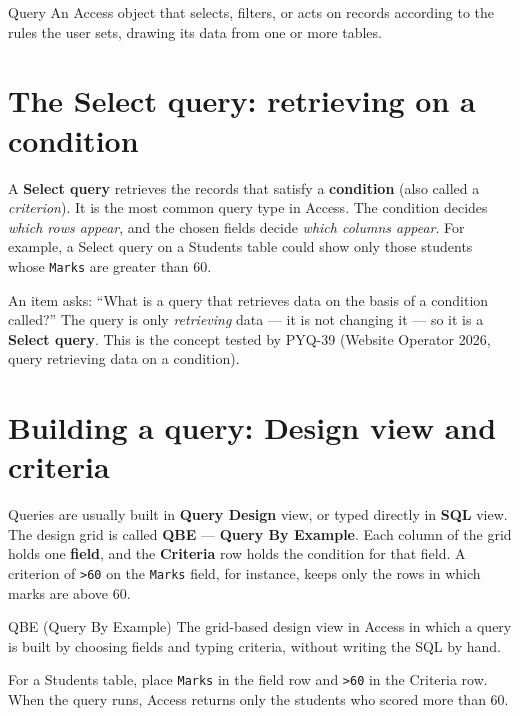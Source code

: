 \begin{definitionbox}{Query}
An Access object that selects, filters, or acts on records according to the
rules the user sets, drawing its data from one or more tables.
\end{definitionbox}

\section{The Select query: retrieving on a condition}
A \textbf{Select query} retrieves the records that satisfy a
\textbf{condition} (also called a \emph{criterion}). It is the most common
query type in Access. The condition decides \emph{which rows appear}, and
the chosen fields decide \emph{which columns appear}. For example, a Select
query on a Students table could show only those students whose
\texttt{Marks} are greater than 60.

\begin{example}
An item asks: ``What is a query that retrieves data on the basis of a
condition called?'' The query is only \emph{retrieving} data --- it is not
changing it --- so it is a \textbf{Select query}. This is the concept tested
by PYQ-39 (Website Operator 2026, query retrieving data on a condition).
\end{example}

\section{Building a query: Design view and criteria}
Queries are usually built in \textbf{Query Design} view, or typed directly in
\textbf{SQL} view. The design grid is called \textbf{QBE} ---
\textbf{Query By Example}. Each column of the grid holds one \textbf{field},
and the \textbf{Criteria} row holds the condition for that field. A criterion
of \texttt{>60} on the \texttt{Marks} field, for instance, keeps only the
rows in which marks are above 60.

\begin{definitionbox}{QBE (Query By Example)}
The grid-based design view in Access in which a query is built by choosing
fields and typing criteria, without writing the SQL by hand.
\end{definitionbox}

\begin{example}
For a Students table, place \texttt{Marks} in the field row and \texttt{>60}
in the Criteria row. When the query runs, Access returns only the students
who scored more than 60.
\end{example}

